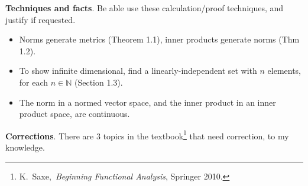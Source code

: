 \documentclass[12pt]{amsart}
\newcommand{\normalspacing}{\renewcommand{\baselinestretch}{1.1}\tiny\normalsize}
\newcommand{\NN}{{\mathbb{N}}}
\newcommand{\textbook}{K.~Saxe,~\emph{Beginning Functional Analysis}, Springer 2010.}
\begin{document}
\normalspacing
\medskip
\noindent \textbf{Techniques and facts}.  Be able use these calculation/proof techniques, and justify if requested.
\begin{itemize}
\item Norms generate metrics (Theorem 1.1), inner products generate norms (Thm 1.2).
\item To show infinite dimensional, find a linearly-independent set with $n$ elements, for each $n\in \NN$ (Section 1.3).
\item The norm in a normed vector space, and the inner product in an inner product space, are continuous.
\end{itemize}

\normalspacing
\medskip
\noindent \textbf{Corrections}.  There are 3 topics in the textbook\footnote{\textbook} that need correction, to my knowledge.
\end{document}
